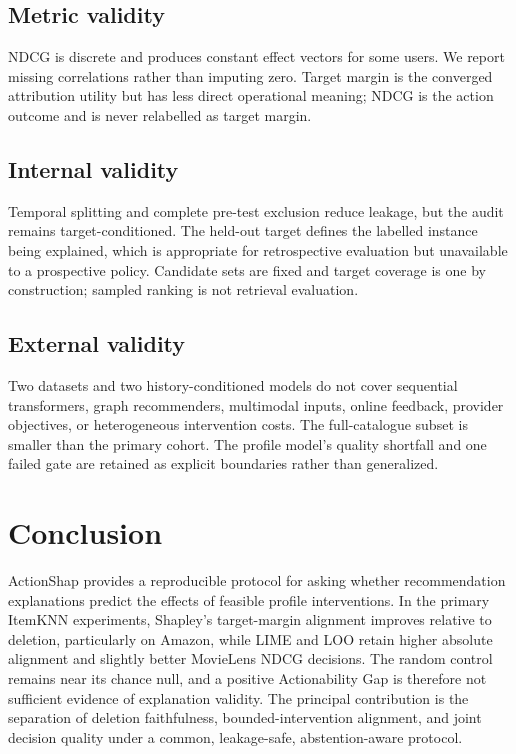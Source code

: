 \documentclass[pdflatex,sn-basic,Numbered]{sn-jnl}
\theoremstyle{thmstyleone}
\theoremstyle{thmstyletwo}
\theoremstyle{thmstylethree}
\begin{document}
\subsection{Metric validity}
NDCG is discrete and produces constant effect vectors for some users. We report missing correlations rather than imputing zero. Target margin is the converged attribution utility but has less direct operational meaning; NDCG is the action outcome and is never relabelled as target margin.

\subsection{Internal validity}
Temporal splitting and complete pre-test exclusion reduce leakage, but the audit remains target-conditioned. The held-out target defines the labelled instance being explained, which is appropriate for retrospective evaluation but unavailable to a prospective policy. Candidate sets are fixed and target coverage is one by construction; sampled ranking is not retrieval evaluation.

\subsection{External validity}
Two datasets and two history-conditioned models do not cover sequential transformers, graph recommenders, multimodal inputs, online feedback, provider objectives, or heterogeneous intervention costs. The full-catalogue subset is smaller than the primary cohort. The profile model’s quality shortfall and one failed gate are retained as explicit boundaries rather than generalized.

\section{Conclusion}
ActionShap provides a reproducible protocol for asking whether recommendation explanations predict the effects of feasible profile interventions. In the primary ItemKNN experiments, Shapley’s target-margin alignment improves relative to deletion, particularly on Amazon, while LIME and LOO retain higher absolute alignment and slightly better MovieLens NDCG decisions. The random control remains near its chance null, and a positive Actionability Gap is therefore not sufficient evidence of explanation validity. The principal contribution is the separation of deletion faithfulness, bounded-intervention alignment, and joint decision quality under a common, leakage-safe, abstention-aware protocol.
\end{document}
